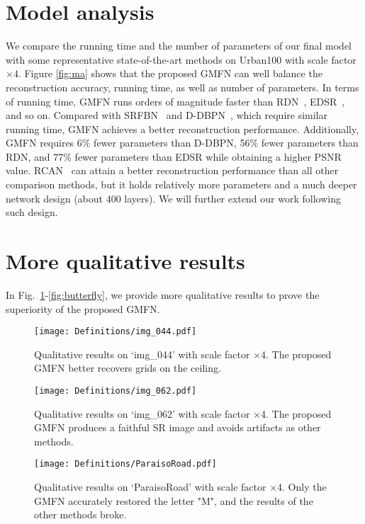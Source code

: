 \documentclass{bmvc2k}
\begin{document}
\section{Model analysis}
\label{sec:ma}
We compare the running time and the number of parameters of our final model with some representative state-of-the-art methods on Urban100 with scale factor $\times 4$. Figure \ref{fig:ma} shows that the proposed GMFN can well balance the reconstruction accuracy, running time, as well as number of parameters. In terms of running time, GMFN runs orders of magnitude faster than RDN~\cite{zhang2018residual}, EDSR~\cite{lim2017enhanced}, and so on. Compared with SRFBN~\cite{li2019srfbn} and D-DBPN~\cite{haris2018deep}, which require similar running time, GMFN achieves a better reconstruction performance. Additionally, GMFN requires 6\% fewer parameters than D-DBPN, 56\% fewer parameters than RDN, and 77\% fewer parameters than EDSR while obtaining a higher PSNR value. RCAN~\cite{zhang2018image} can attain a better reconstruction performance than all other comparison methods, but it holds relatively more parameters and a much deeper network design (about 400 layers). We will further extend our work following such design. 

\section{More qualitative results}
\label{sec:mqr}
In Fig.~\ref{fig:img_044}-\ref{fig:butterfly}, we provide more qualitative results to prove the superiority of the proposed GMFN. 


\begin{figure}[htbp]
	\centering
	{\texttt{[image: Definitions/img\_044.pdf]}} 
	\caption{Qualitative results on `img\_044' with scale factor $\times$4. The proposed GMFN better recovers grids on the ceiling.}
	\label{fig:img_044}
\end{figure}

\begin{figure}[htbp]
	\centering
	{\texttt{[image: Definitions/img\_062.pdf]}} 
	\caption{Qualitative results on `img\_062' with scale factor $\times$4. The proposed GMFN produces a faithful SR image and avoids artifacts as other methods.}
	\label{fig:img_062}
\end{figure}

\begin{figure}[htbp]
	\centering
	{\texttt{[image: Definitions/ParaisoRoad.pdf]}} 
	\caption{Qualitative results on `ParaisoRoad' with scale factor $\times$4. Only the GMFN accurately restored the letter "M", and the results of the other methods broke.}
	\label{fig:ParaisoRoad}
\end{figure} 
\end{document}
